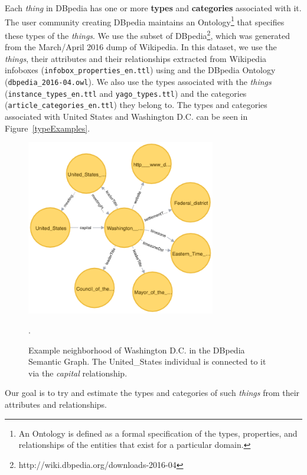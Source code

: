 \documentclass[runningheads,a4paper]{IEEEtran}
\begin{document}
Each \textit{thing} in DBpedia has one or more \textbf{types} and \textbf{categories} associated with it. 
The user community creating DBpedia maintains an Ontology\footnote{An Ontology is defined as a formal specification of the types, properties, and relationships of the entities that exist for a particular domain.} that specifies these types of the \textit{things}. 
We use the subset of DBpedia\footnote{http://wiki.dbpedia.org/downloads-2016-04}, which was generated from the March/April 2016 dump of Wikipedia. In this dataset, we use the \textit{things}, their attributes and 
their relationships extracted from Wikipedia infoboxes (\texttt{infobox\_properties\_en.ttl}) using and the DBpedia Ontology (\texttt{dbpedia\_2016-04.owl}). We also use the types associated with the \textit{things} (\texttt{instance\_types\_en.ttl} and \texttt{yago\_types.ttl}) and the categories (\texttt{article\_categories\_en.ttl}) they belong to. The types and categories  associated with United States and Washington D.C. can be seen in Figure~\ref{typeExamples}.

\begin{figure}[h]
\centering
\includegraphics[width=3.25in]{figures/graph.png}
\caption{Example neighborhood of Washington D.C. in the DBpedia Semantic Graph. The United\_States individual is connected to it via the \textit{capital} relationship.}
\label{graph}.
\end{figure}

Our goal is to try and estimate the types and categories of such \textit{things} from their attributes and relationships.  
%
\end{document}
